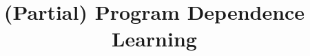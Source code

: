 \documentclass[conference]{IEEEtran}
\begin{document}
\title{(Partial) Program Dependence Learning}



\maketitle
\end{document}
